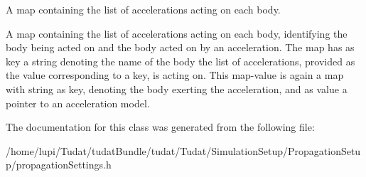 A map containing the list of accelerations acting on each body. 

A map containing the list of accelerations acting on each body, identifying the body being acted on and the body acted on by an acceleration. The map has as key a string denoting the name of the body the list of accelerations, provided as the value corresponding to a key, is acting on. This map-\/value is again a map with string as key, denoting the body exerting the acceleration, and as value a pointer to an acceleration model. 

The documentation for this class was generated from the following file\+:\begin{DoxyCompactItemize}
\item 
/home/lupi/\+Tudat/tudat\+Bundle/tudat/\+Tudat/\+Simulation\+Setup/\+Propagation\+Setup/propagation\+Settings.\+h\end{DoxyCompactItemize}
